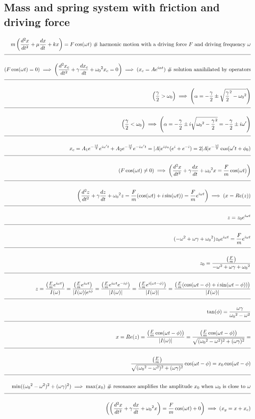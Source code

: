 \documentclass[a4paper]{article}
\newcommand{\eqComment}[1]{\text{  \# #1}}
\newcommand{\n}{\\[1.5ex] \hline \nonumber \\[0ex]}
\begin{document}
\subsection{Mass and spring system with friction and driving force}
\begin{tcolorbox}
\begin{align}
   m \left(\frac{d^2x}{dt^2} + \mu \frac{dx}{dt} + k x\right) = F \cos(\omega t) \eqComment{harmonic motion with a driving force $F$ and driving frequency $\omega$}
\n (F \cos(\omega t) = 0) \implies \left(\frac{d^2{x_c}}{dt^2} + \gamma \frac{d{x_c}}{dt} + {\omega_0}^2 {x_c} = 0\right) \implies ({x_c} = A e^{i \alpha t}) \eqComment{solution annihilated by operators}
\n \left(\frac{\gamma}{2} > \omega_0\right) \implies \left(\alpha = -\frac{\gamma}{2} \pm \sqrt{{\frac{\gamma}{2}}^2 - {\omega_0}^2}\right)
\n \left(\frac{\gamma}{2} < \omega_0\right) \implies \left(\alpha = -\frac{\gamma}{2} \pm i \sqrt{{\omega_0}^2 - {\frac{\gamma}{2}}^2} = -\frac{\gamma}{2} \pm i \omega^\prime\right)
\n {x_c} = A_1 e^{-\frac{\gamma t}{2}} e^{i \omega^\prime t} +  A_2 e^{-\frac{\gamma t}{2}} e^{-i \omega^\prime t} = |A| e^{i \phi_0} (e^{i} + e^{-i}) = 2 |A| e^{-\frac{\gamma t}{2}} \cos(\omega^\prime t + \phi_0)
\n (F \cos(\omega t) \neq 0) \implies \left(\frac{d^2x}{dt^2} + \gamma \frac{dx}{dt} + {\omega_0}^2 x = \frac{F}{m} \cos(\omega t)\right)
\n \left(\frac{d^2z}{dt^2} + \gamma \frac{dz}{dt} + {\omega_0}^2 z = \frac{F}{m} (\cos(\omega t) + i \sin(\omega t)) = \frac{F}{m} e^{i \omega t}\right) \implies (x = Re(z))
\n z = z_0 e^{i \omega t}
\n (-\omega^2 + \omega \gamma + {\omega_0}^2) z_0 e^{i \omega t} = \frac{F}{m} e^{i \omega t}
\n z_0 = \frac{\left(\frac{F}{m}\right)}{-\omega^2 + \omega \gamma + {\omega_0}^2}
\n z = \frac{\left(\frac{F}{m} e^{i \omega t}\right)}{I(\omega)} = \frac{\left(\frac{F}{m} e^{i \omega t}\right)}{|I(\omega)| e^{i \phi}} = \frac{\left(\frac{F}{m} e^{i \omega t}  e^{-i \phi}\right)}{|I(\omega)|} = \frac{\left(\frac{F}{m} e^{i (\omega t - \phi)}\right)}{|I(\omega)|} = \frac{\left(\frac{F}{m} (\cos(\omega t - \phi) + i \sin(\omega t - \phi))\right)}{|I(\omega)|} 
\n \tan(\phi) = \frac{\omega \gamma}{{\omega_0}^2 - \omega^2}
\n x = Re(z) = \frac{\left(\frac{F}{m} \cos(\omega t - \phi)\right)}{|I(\omega)|} = \frac{\left(\frac{F}{m} \cos(\omega t - \phi)\right)}{\sqrt{({\omega_0}^2 - \omega^2)^2 + (\omega \gamma)^2}} = \n
\frac{\left(\frac{F}{m}\right)}{\sqrt{({\omega_0}^2 - \omega^2)^2 + (\omega \gamma)^2}} \cos(\omega t - \phi) = x_0 \cos(\omega t - \phi)
\n \min(({\omega_0}^2 - \omega^2)^2 + (\omega \gamma)^2) \implies \max(x_0) \eqComment{resonance amplifies the amplitude $x_0$ when $\omega_0$ is close to $\omega$}
\n \left(\left(\frac{d^2x}{dt^2} + \gamma \frac{dx}{dt} + {\omega_0}^2 x\right) = \frac{F}{m} \cos(\omega t) + 0\right) \implies (x_g = x + x_c)
\end{align}
\end{tcolorbox}
\end{document}
